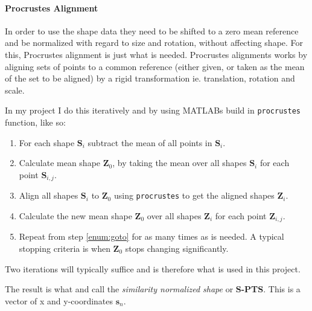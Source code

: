 \documentclass[Main]{subfiles}
\begin{document}
			\paragraph{Procrustes Alignment} %
				\label{par:procrustes_alignment}
				In order to use the shape data they need to be shifted to a zero mean reference and be normalized with regard to size and rotation, without affecting shape.
				For this, Procrustes alignment is just what is needed.
				Procrustes alignments works by aligning sets of points to a common reference (either given, or taken as the mean of the set to be aligned) by a rigid transformation ie. translation, rotation and scale.

				In my project I do this iteratively and by using MATLABs build in \texttt{procrustes} function, like so:
				\begin{enumerate}

					\item
					For each shape $\textbf{S}_i$ subtract the mean of all points in $\textbf{S}_i$.

					\item
					Calculate mean shape $\textbf{Z}_0$, by taking the mean over all shapes $\textbf{S}_i$ for each point $\textbf{S}_{i,j}$.

					\item
					\label{enum:goto}
					Align all shapes $\textbf{S}_i$ to $\textbf{Z}_0$ using \texttt{procrustes} to get the aligned shapes $\textbf{Z}_i$.

					\item
					Calculate the new mean shape $\textbf{Z}_0$ over all shapes $\textbf{Z}_i$ for each point $\textbf{Z}_{i,j}$.

					\item
					Repeat from step \ref{enum:goto} for as many times as is needed. 
					A typical stopping criteria is when $\textbf{Z}_0$ stops changing significantly.

				\end{enumerate}
				Two iterations will typically suffice and is therefore what is used in this project.

				The result is what \cite{Lucey2011} and \cite{Ashraf2009} call the  \emph{similarity normalized shape} or \textbf{S-PTS}.
				This is a vector of x and y-coordinates $\textbf{s}_n$.


\end{document}
